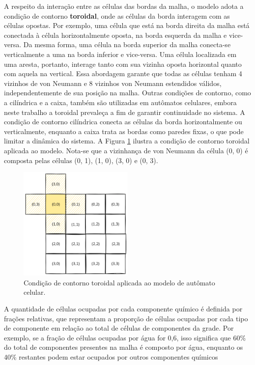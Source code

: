 \documentclass[12pt,oneside]{report}
\begin{document}
A respeito da interação entre as células das bordas da malha, o modelo adota a condição de contorno \textbf{toroidal}, onde as células da borda interagem com as células opostas. Por exemplo, uma célula que está na borda direita da malha está conectada à célula horizontalmente oposta, na borda esquerda da malha e vice-versa. Da mesma forma, uma célula na borda superior da malha conecta-se verticalmente a uma na borda inferior e vice-versa. Uma célula localizada em uma aresta, portanto, interage tanto com sua vizinha oposta horizontal quanto com aquela na vertical. Essa abordagem garante que todas as células tenham 4 vizinhos de von Neumann e 8 vizinhos von Neumann estendidos válidos, independentemente de sua posição na malha. Outras condições de contorno, como a cilíndrica e a caixa, também são utilizadas em autômatos celulares, embora neste trabalho a toroidal prevaleça a fim de garantir continuidade no sistema. A condição de contorno cilíndrica conecta as células da borda horizontalmente ou verticalmente, enquanto a caixa trata as bordas como paredes fixas, o que pode limitar a dinâmica do sistema. A Figura \ref{fig:torus} ilustra a condição de contorno toroidal aplicada ao modelo. Nota-se que a vizinhança de von Neumann da célula (0, 0) é composta pelas células (0, 1), (1, 0), (3, 0) e (0, 3).

\begin{figure}[H]
    \centering
    \includegraphics[width=0.5\textwidth]{torus.png}
    \caption{\small Condição de contorno toroidal aplicada ao modelo de autômato celular.}
    \label{fig:torus}
\end{figure}

A quantidade de células ocupadas por cada componente químico é definida por frações relativas, que representam a proporção de células ocupadas por cada tipo de componente em relação ao total de células de componentes da grade. Por exemplo, se a fração de células ocupadas por água for 0,6, isso significa que 60\% do total de componentes presentes na malha é composto por água, enquanto os 40\% restantes podem estar ocupados por outros componentes químicos
\end{document}
